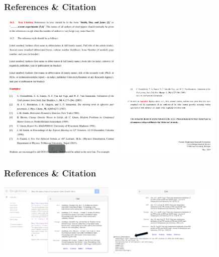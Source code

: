 \documentclass{beamer}
\begin{document}
\begin{frame}
\frametitle{\bf References \& Citation}
\includegraphics[width=6cm]{RS1}
\includegraphics[width=5cm]{RS}
\end{frame}
\begin{frame}
\frametitle{\bf References \& Citation}
\includegraphics[width=5.5cm]{GS}
\includegraphics[width=5.5cm]{GS1}
\end{frame}
\end{document}

